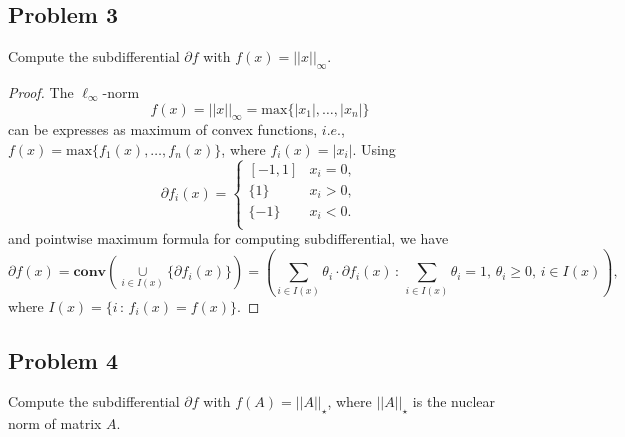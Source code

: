 \documentclass[11pt]{article}
\begin{document}
\subsection*{Problem 3}
Compute the subdifferential $\partial f$ with $f(x) = ||x||_\infty$.

\begin{proof}
The $\ell_\infty$-norm
\[
f(x) = ||x||_\infty = \text{max}\{|x_1|,\dots,|x_n|\}
\]
can be expresses as maximum of convex functions, $i.e.$, $f(x) = \text{max}\{f_1(x),\dots,f_n(x)\}$, where $f_i(x) = |x_i|$. Using
\begin{equation*}
    \partial f_i(x)= 
    \begin{cases}
        [-1,1]  & x_i=0,\\
        \{1\}   & x_i>0,\\
        \{-1\}  & x_i<0.\\
    \end{cases}
\end{equation*}
and pointwise maximum formula for computing subdifferential, we have
\[
\partial f(x) = \textbf{conv}\left(\cup\limits_{i \in I(x)}\{\partial f_i(x)\}\right)=\left(\sum\limits_{i\in I(x)} \theta_i \cdot \partial f_i(x)\,:\,\sum\limits_{i\in I(x)} \theta_i=1,\,\theta_i \geq 0,\,i \in I(x)\right),
\]
where $I(x) = \{i\,:\,f_i(x)=f(x)\}$.

\end{proof}

\subsection*{Problem 4}
Compute the subdifferential $\partial f$ with $f(A)=||A||_\star$, where $||A||_\star$ is the nuclear norm of matrix $A$.
\end{document}
